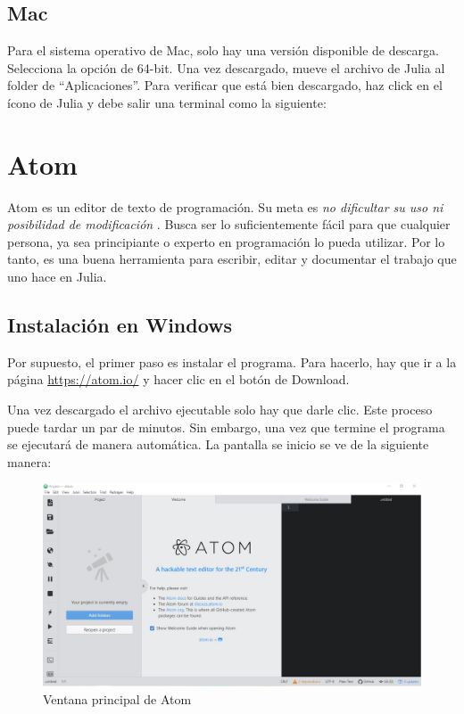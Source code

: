 \subsection{Mac}
Para el sistema operativo de Mac, solo hay una versión disponible de descarga. Selecciona la opción de 64-bit. Una vez descargado, mueve el archivo de Julia al folder de \textquotedblleft Aplicaciones\textquotedblright. Para verificar que está bien descargado, haz click en el ícono de Julia y debe salir una terminal como la siguiente: 


\section{Atom}
Atom es un editor de texto de programación. Su meta es \textit{no dificultar su uso ni posibilidad de modificación} \citep{ATOM}.  Busca ser lo suficientemente fácil para que cualquier persona, ya sea principiante o experto en programación lo pueda utilizar. Por lo tanto, es una buena herramienta para escribir, editar y documentar el trabajo que uno hace en Julia. 

\subsection{Instalación en Windows} 
Por supuesto, el primer paso es instalar el programa. Para hacerlo, hay que ir a la página \url{https://atom.io/} y hacer clic en el botón de \textsf{Download}. 

Una vez descargado el archivo ejecutable solo hay que darle clic. Este proceso puede tardar un par de minutos. Sin embargo, una vez que termine el programa se ejecutará de manera automática. La pantalla se inicio se ve de la siguiente manera:

\begin{figure}[h]
\begin{center}
\includegraphics[scale=0.45]{Imagenes/atom_main_window.JPG}
 \caption{Ventana principal de Atom}
  \label{main_atom}
\end{center}
\end{figure}

